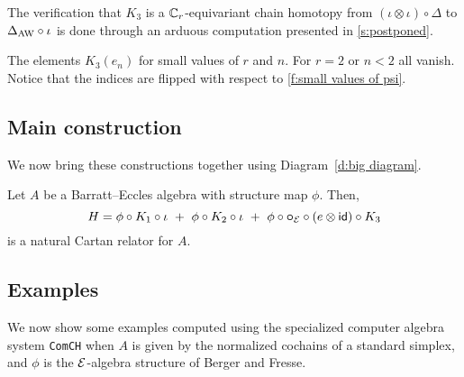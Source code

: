 The verification that $K_3$ is a $\mathbb{C}_r$-equivariant chain homotopy from $(\iota\otimes \iota)\circ \Delta$ to $\Delta_{\operatorname{AW}}\circ \iota$ is done through an arduous computation presented in \cref{s:postponed}.

\begin{table}
	\centering
	
	\caption{The elements $K_3(e_n)$ for small values of $r$ and $n$. For $r=2$ or $n<2$ all vanish. Notice that the indices are flipped with respect to \cref{f:small values of psi}.}
	\label{f:small values of K}
\end{table}

\subsection{Main construction}

We now bring these constructions together using Diagram~\eqref{d:big diagram}.

\begin{theorem*}
	Let $A$ be a Barratt--Eccles algebra with structure map $\phi$.
	Then,
	\[
	H = \phi \circ K_1 \circ \iota \ +\ \phi \circ K_2 \circ \iota \ +\ \phi \circ \bcirc_{\BE} \circ (e \ot \id)\circ K_3
	\]
	is a natural Cartan relator for $A$.
\end{theorem*}

\subsection{Examples}

We now show some examples computed using the specialized computer algebra system \texttt{ComCH} \cite{medina2021comch} when $A$ is given by the normalized cochains of a standard simplex, and $\phi$ is the $\mathcal{E}$-algebra structure of Berger and Fresse.
